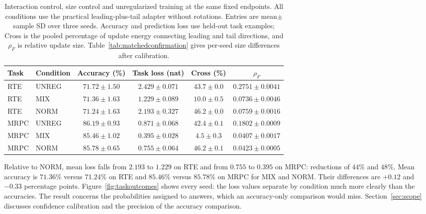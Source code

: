 \documentclass{article}
\begin{document}
\begin{table}[t]
\centering
\caption{Interaction control, size control and unregularized training at the same fixed endpoints. All conditions use the practical leading-plus-tail adapter without rotations. Entries are mean$\pm$sample SD over three seeds. Accuracy and prediction loss use held-out task examples; Cross is the pooled percentage of update energy connecting leading and tail directions, and $\rho_F$ is relative update size. Table~\ref{tab:matchedconfirmation} gives per-seed size differences after calibration.}
\label{tab:learningandmixing}
\begin{adjustbox}{max width=\linewidth}
\begin{tabular}{llcccc}
\toprule
Task & Condition & Accuracy (\%) & Task loss (nat) & Cross (\%) & $\rho_F$\\
\midrule
RTE & UNREG & $71.72 \pm 1.50$ & $2.429 \pm 0.071$ & $43.7 \pm 0.0$ & $0.2751 \pm 0.0041$ \\
RTE & MIX & $71.36 \pm 1.63$ & $1.229 \pm 0.089$ & $10.0 \pm 0.5$ & $0.0736 \pm 0.0046$ \\
RTE & NORM & $71.24 \pm 1.63$ & $2.193 \pm 0.327$ & $46.2 \pm 0.0$ & $0.0759 \pm 0.0016$ \\
\midrule
MRPC & UNREG & $86.19 \pm 0.93$ & $0.871 \pm 0.068$ & $42.4 \pm 0.1$ & $0.1802 \pm 0.0009$ \\
MRPC & MIX & $85.46 \pm 1.02$ & $0.395 \pm 0.028$ & $4.5 \pm 0.3$ & $0.0407 \pm 0.0017$ \\
MRPC & NORM & $85.78 \pm 0.65$ & $0.755 \pm 0.064$ & $46.2 \pm 0.1$ & $0.0423 \pm 0.0005$ \\
\bottomrule
\end{tabular}
\end{adjustbox}
\end{table}

Relative to NORM, mean loss falls from $2.193$ to $1.229$ on RTE and from $0.755$ to $0.395$ on MRPC: reductions of $44\%$ and $48\%$. Mean accuracy is $71.36\%$ versus $71.24\%$ on RTE and $85.46\%$ versus $85.78\%$ on MRPC for MIX and NORM. Their differences are $+0.12$ and $-0.33$ percentage points. Figure~\ref{fig:taskoutcomes} shows every seed: the loss values separate by condition much more clearly than the accuracies. The result concerns the probabilities assigned to answers, which an accuracy-only comparison would miss. Section~\ref{sec:scope} discusses confidence calibration and the precision of the accuracy comparison.
\end{document}
